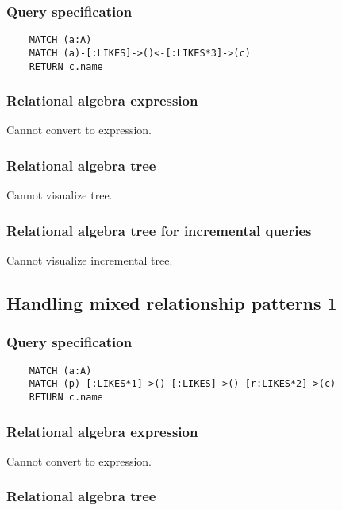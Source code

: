 	\subsubsection*{Query specification}

	\begin{lstlisting}
	MATCH (a:A)
	MATCH (a)-[:LIKES]->()<-[:LIKES*3]->(c)
	RETURN c.name
	\end{lstlisting}


	\subsubsection*{Relational algebra expression}

	Cannot convert to expression.

	\subsubsection*{Relational algebra tree}

	Cannot visualize tree.

	\subsubsection*{Relational algebra tree for incremental queries}

	Cannot visualize incremental tree.
	\subsection{Handling mixed relationship patterns 1}

	\subsubsection*{Query specification}

	\begin{lstlisting}
	MATCH (a:A)
	MATCH (p)-[:LIKES*1]->()-[:LIKES]->()-[r:LIKES*2]->(c)
	RETURN c.name
	\end{lstlisting}


	\subsubsection*{Relational algebra expression}

	Cannot convert to expression.

	\subsubsection*{Relational algebra tree}

